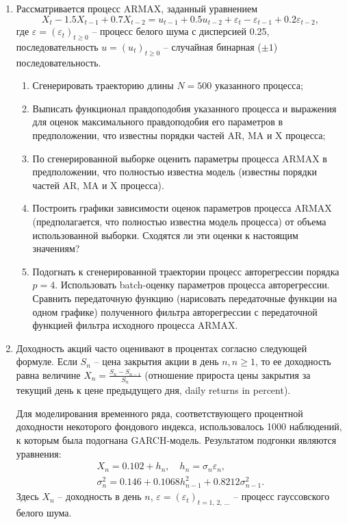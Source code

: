 \documentclass[a4paper,14pt]{extreport}
\renewcommand{\=}[1]{\stackrel{#1}{=}} %
\newcommand{\generaltime}{t \geqslant 0}
\newcommand{\discretetime}{t = 1,\,2,\,\ldots}
\newcommand{\newprocess}[1]{
	\ensuremath{
		#1 = \left(#1 _t\right)_{\generaltime}
	}
}
\newcommand{\newprocessd}[1]{
	\ensuremath{
		#1 = \left(#1 _t\right)_{\discretetime}
	}
}
\begin{document}
\begin{enumerate}
	\item Рассматривается процесс ARMAX, заданный уравнением
	\[
	X_t - 1.5 X_{t-1} + 0.7 X_{t-2} = u_{t-1} + 0.5 u_{t-2} + 
		\varepsilon_{t} - \varepsilon_{t-1} + 0.2 \varepsilon_{t-2},
	\]
	где $\newprocess{\varepsilon}$ -- процесс белого шума с дисперсией 0.25,
	последовательность $\newprocess{u}$ -- случайная бинарная ($\pm 1$) последовательность.
	\begin{enumerate}
		\item Сгенерировать траекторию длины $N = 500$ указанного процесса;
		\item Выписать функционал правдоподобия указанного процесса
		и выражения для оценок максимального правдоподобия его параметров
		в предположении, что известны порядки частей AR, MA и X процесса;
		\item По сгенерированной выборке оценить параметры
		процесса ARMAX в предположении, что полностью известна
		модель (известны порядки частей AR, MA и X процесса).
		\item Построить графики зависимости оценок параметров
		процесса ARMAX (предполагается, что полностью известна
		модель процесса) от объема использованной выборки.
		Сходятся ли эти оценки к настоящим значениям?
		\item Подогнать к сгенерированной траектории процесс
		авторегрессии порядка $p = 4$. Использовать batch-оценку
		параметров процесса авторегрессии. Сравнить передаточную
		функцию (нарисовать передаточные функции на одном графике)
		полученного фильтра авторегрессии с передаточной
		функцией фильтра исходного процесса ARMAX.
	\end{enumerate}

	\item 
	Доходность акций часто оценивают в процентах согласно следующей формуле.
	Если $S_n$ -- цена закрытия акции в день $n, n \geqslant 1$, то ее доходность равна величине
	$X_n = \frac{S_n - S_{n-1}}{S_n}$ (отношение прироста цены закрытия
	за текущий день к цене предыдущего дня, daily returns in percent). 

	Для моделирования временного ряда, соответствующего процентной
	доходности некоторого фондового индекса, использовалось 1000 наблюдений,
	к которым была подогнана GARCH-модель. Результатом подгонки являются уравнения:
	\begin{align*}
	X_n = 0.102 + h_n, 
	\quad 
	h_n = \sigma_n \varepsilon_n, \\
	\sigma_n^2 = 0.146 + 0.1068 h_{n-1}^2 + 0.8212 \sigma_{n-1}^2.
	\end{align*}
	Здесь $X_n$ -- доходность в день $n$, $\newprocessd{\varepsilon}$ --
	процесс гауссовского белого шума.


\end{enumerate}
\end{document}
